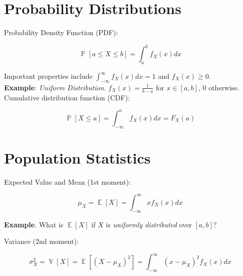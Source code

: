 \documentclass[12pt,twoside]{article}
\title{\assignmentname}
\author{CBE 20258: Numerical and Statistical Analysis}
\DeclareMathOperator{\EX}{\mathbb{E}}%
\DeclareMathOperator{\PR}{\mathbb{P}}%
\DeclareMathOperator{\VR}{\mathbb{V}}%
\begin{document}

\date{February 12 - 14, 2018}



\section{Probability Distributions}

Probability Density Function (PDF):

\begin{equation}
	\PR{}[a \leq X \leq b] = \int_a^{b} f_X(x) dx
\end{equation}

Important properties include $\int_{-\infty}^{\infty} f_X(x) dx = 1$ and $f_{X}(x) \geq 0$. \\

\textbf{Example}: \emph{Uniform Distribution}. $f_X(x) = \frac{1}{b-a}$ for $x \in [a,b]$, $0$ otherwise. \\

Cumulative distribution function (CDF):

\begin{equation}
	\PR{}[X \leq a] = \int_{-\infty}^{a} f_X(x) dx = F_X(a)
\end{equation}


\section{Population Statistics}

Expected Value and Mean (1st moment):

\begin{equation}
\mu_X = \EX[X] = \int_{-\infty}^{\infty} x f_{X}(x) dx
\end{equation}

\textbf{Example}. What is $\EX[X]$ if $X$ is \emph{uniformly distributed} over $[a, b]$?

\vspace{0.15\textheight}

Variance (2nd moment):

\begin{equation}
	\sigma^2_{X} = \VR{}[X] = \EX[(X - \mu_X)^2] = \int_{-\infty}^{\infty} (x - \mu_X)^2 f_X(x) dx
\end{equation}
\end{document}
